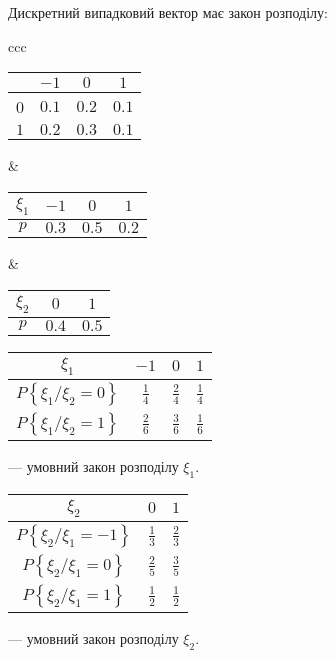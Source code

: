 \begin{example}
    Дискретний випадковий вектор має закон розподілу:

    \begin{tabular}{ccc}
        \begin{tabular}{|c|c|c|c|}
            \hline
            \diagbox{$\xi_2$}{$\xi_1$} & $-1$ & $0$ & $1$\\
            \hline
            0 & $0.1$ & $0.2$ & $0.1$ \\
            \hline
            $1$ & $0.2$ & $0.3$ & $0.1$ \\
            \hline
        \end{tabular}
        &
        \begin{tabular}{|c|c|c|c|}
            \hline
            $\xi_1$ & $-1$ & $0$ & $1$ \\
            \hline
            $p$ & $0.3$ & $0.5$ & $0.2$ \\
            \hline
        \end{tabular}
        &
        \begin{tabular}{|c|c|c|}
            \hline
            $\xi_2$ & $0$ & $1$ \\
            \hline
            $p$ & $0.4$ & $0.5$ \\
            \hline
        \end{tabular}
    \end{tabular}
\end{example}

\begin{tabular}{|c|c|c|c|}
    \hline
    $\xi_1$ & $-1$ & $0$ & $1$ \\
    \hline
    $P\left\{\xi_1 / \xi_2 = 0\right\}$ & $\frac{1}{4}$ 
    & $\frac{2}{4}$ & $\frac{1}{4}$ \\
    \hline
    $P\left\{\xi_1 / \xi_2 = 1\right\}$ & $\frac{2}{6}$ 
    & $\frac{3}{6}$ & $\frac{1}{6}$ \\
    \hline
\end{tabular}
--- умовний закон розподілу $\xi_1$.

\begin{tabular}{|c|c|c|}
    \hline
    $\xi_2$ & $0$ & $1$ \\
    \hline
    $P\left\{\xi_2 / \xi_1 = -1\right\}$ & $\frac{1}{3}$ 
    & $\frac{2}{3}$ \\
    \hline
    $P\left\{\xi_2 / \xi_1 = 0\right\}$ & $\frac{2}{5}$ 
    & $\frac{3}{5}$\\
    \hline
    $P\left\{\xi_2 / \xi_1 = 1\right\}$ & $\frac{1}{2}$ 
    & $\frac{1}{2}$\\
    \hline
\end{tabular}
--- умовний закон розподілу $\xi_2$.

